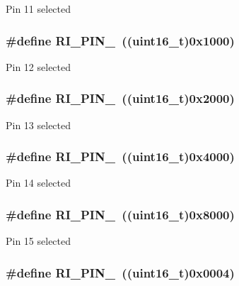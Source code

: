 Pin 11 selected \hypertarget{group___r_i___pin_gaaccc7bafa925a119c19e6ad8a648cce2}{
\subsubsection[{R\-I\-\_\-\-P\-I\-N\-\_\-12}]{\setlength{\rightskip}{0pt plus 5cm}\#define R\-I\-\_\-\-P\-I\-N\-\_~((uint16\-\_\-t)0x1000)}}\label{group___r_i___pin_gaaccc7bafa925a119c19e6ad8a648cce2}
Pin 12 selected \hypertarget{group___r_i___pin_ga155ffce85eb8da785a973bc239db95e3}{
\subsubsection[{R\-I\-\_\-\-P\-I\-N\-\_\-13}]{\setlength{\rightskip}{0pt plus 5cm}\#define R\-I\-\_\-\-P\-I\-N\-\_~((uint16\-\_\-t)0x2000)}}\label{group___r_i___pin_ga155ffce85eb8da785a973bc239db95e3}
Pin 13 selected \hypertarget{group___r_i___pin_gafa312ad93801f8c9e12eefd7ded80992}{
\subsubsection[{R\-I\-\_\-\-P\-I\-N\-\_\-14}]{\setlength{\rightskip}{0pt plus 5cm}\#define R\-I\-\_\-\-P\-I\-N\-\_~((uint16\-\_\-t)0x4000)}}\label{group___r_i___pin_gafa312ad93801f8c9e12eefd7ded80992}
Pin 14 selected \hypertarget{group___r_i___pin_ga4d6732c2e125652e77c35e213ac21d86}{
\subsubsection[{R\-I\-\_\-\-P\-I\-N\-\_\-15}]{\setlength{\rightskip}{0pt plus 5cm}\#define R\-I\-\_\-\-P\-I\-N\-\_~((uint16\-\_\-t)0x8000)}}\label{group___r_i___pin_ga4d6732c2e125652e77c35e213ac21d86}
Pin 15 selected \hypertarget{group___r_i___pin_gaa274394025b195740a30e1f8ebe2b4e2}{
\subsubsection[{R\-I\-\_\-\-P\-I\-N\-\_\-2}]{\setlength{\rightskip}{0pt plus 5cm}\#define R\-I\-\_\-\-P\-I\-N\-\_~((uint16\-\_\-t)0x0004)}}\label{group___r_i___pin_gaa274394025b195740a30e1f8ebe2b4e2}
